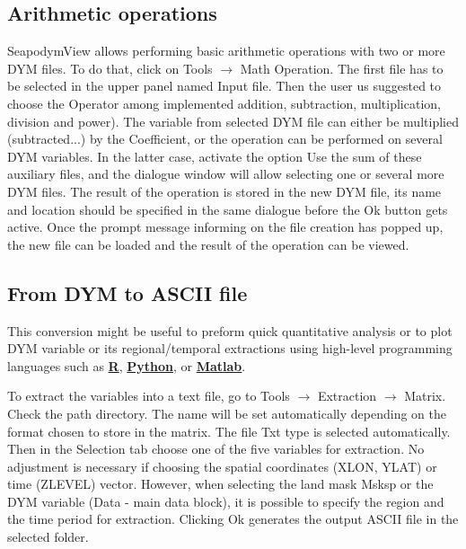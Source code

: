 \subsection{Arithmetic operations}

SeapodymView allows performing basic arithmetic operations with two or more DYM files. To do that, click on  {\ttfamily Tools $\rightarrow$ Math Operation}. The first file has to be selected in the upper panel named {\ttfamily Input file}. Then the user us suggested to choose the {\ttfamily Operator} among implemented addition, subtraction, multiplication, division and power). The variable from selected DYM file can either be multiplied (subtracted...) by the {\ttfamily Coefficient}, or the operation can be performed on several DYM variables. In the latter case, activate the option {\ttfamily Use the sum of these auxiliary files}, and the dialogue window will allow selecting one or several more DYM files. The result of the operation is stored in the new DYM file, its name and location should be specified in the same dialogue before the {\ttfamily Ok} button gets active. Once the prompt message informing on the file creation has popped up, the new file can be loaded and the result of the operation can be viewed.


\subsection{From DYM to ASCII file}

This conversion might be useful to preform quick quantitative analysis or to plot DYM variable or its regional/temporal extractions using high-level programming languages such as \href{https://www.r-project.org/}{\textbf{R}}, \href{https://www.python.org/}{\textbf{Python}}, or \href{https://fr.mathworks.com/?s_tid=gn_logo}{\textbf{Matlab}}. 

To extract the variables into a text file, go to {\ttfamily Tools $\rightarrow$ Extraction $\rightarrow$ Matrix}. Check the path directory. The name will be set automatically depending on the format chosen to store in the matrix. The file {\ttfamily Txt} type is selected automatically. Then in the {\ttfamily Selection} tab choose one of the five variables for extraction. No adjustment is necessary if choosing the spatial coordinates ({\ttfamily XLON},  {\ttfamily YLAT}) or time ({\ttfamily ZLEVEL}) vector. However, when selecting the land mask {\ttfamily Msksp} or the DYM variable ({\ttfamily Data - main data block}), it is possible to specify the region and the time period for extraction. Clicking {\ttfamily Ok} generates the output ASCII file in the selected folder. \\

